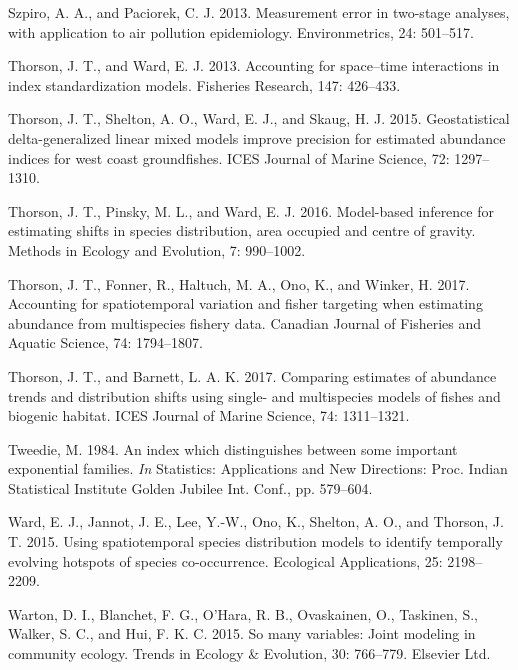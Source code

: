 \documentclass[]{article}
\begin{document}
\hypertarget{ref-szpiro2013}{}
Szpiro, A. A., and Paciorek, C. J. 2013. Measurement error in two-stage
analyses, with application to air pollution epidemiology.
Environmetrics, 24: 501--517.

\hypertarget{ref-thorson2013}{}
Thorson, J. T., and Ward, E. J. 2013. Accounting for space--time
interactions in index standardization models. Fisheries Research, 147:
426--433.

\hypertarget{ref-thorson2015}{}
Thorson, J. T., Shelton, A. O., Ward, E. J., and Skaug, H. J. 2015.
Geostatistical delta-generalized linear mixed models improve precision
for estimated abundance indices for west coast groundfishes. ICES
Journal of Marine Science, 72: 1297--1310.

\hypertarget{ref-thorson2016}{}
Thorson, J. T., Pinsky, M. L., and Ward, E. J. 2016. Model-based
inference for estimating shifts in species distribution, area occupied
and centre of gravity. Methods in Ecology and Evolution, 7: 990--1002.

\hypertarget{ref-thorson2017}{}
Thorson, J. T., Fonner, R., Haltuch, M. A., Ono, K., and Winker, H.
2017. Accounting for spatiotemporal variation and fisher targeting when
estimating abundance from multispecies fishery data. Canadian Journal of
Fisheries and Aquatic Science, 74: 1794--1807.

\hypertarget{ref-thorson2017vast}{}
Thorson, J. T., and Barnett, L. A. K. 2017. Comparing estimates of
abundance trends and distribution shifts using single- and multispecies
models of fishes and biogenic habitat. ICES Journal of Marine Science,
74: 1311--1321.

\hypertarget{ref-tweedie1984}{}
Tweedie, M. 1984. An index which distinguishes between some important
exponential families. \emph{In} Statistics: Applications and New
Directions: Proc. Indian Statistical Institute Golden Jubilee Int.
Conf., pp. 579--604.

\hypertarget{ref-ward2015}{}
Ward, E. J., Jannot, J. E., Lee, Y.-W., Ono, K., Shelton, A. O., and
Thorson, J. T. 2015. Using spatiotemporal species distribution models to
identify temporally evolving hotspots of species co-occurrence.
Ecological Applications, 25: 2198--2209.

\hypertarget{ref-warton2015}{}
Warton, D. I., Blanchet, F. G., O'Hara, R. B., Ovaskainen, O., Taskinen,
S., Walker, S. C., and Hui, F. K. C. 2015. So many variables: Joint
modeling in community ecology. Trends in Ecology \& Evolution, 30:
766--779. Elsevier Ltd.
\end{document}
